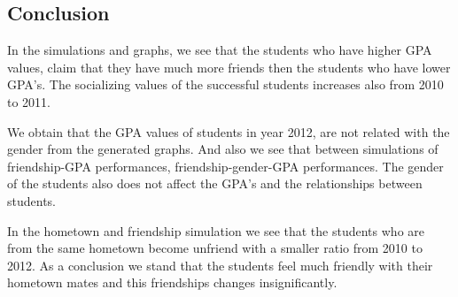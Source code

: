\documentclass[paper=a4, fontsize=11pt]{scrartcl}	%
\numberwithin{equation}{section}		%
\numberwithin{figure}{section}			%
\numberwithin{table}{section}				%
\begin{document}
\subsection{Conclusion}
In the simulations and graphs, we see that the students who have higher GPA values, claim that they have much more friends then the students who have lower GPA's. The socializing values of the successful students increases also from 2010 to 2011. 

We obtain that the GPA values of students in year 2012, are not related with the gender from the generated graphs. And also we see that between simulations of friendship-GPA performances, friendship-gender-GPA performances. The gender of the students also does not affect the GPA's and the relationships between students.

In the hometown and friendship simulation we see that the students who are from the same hometown become unfriend with a smaller ratio from 2010 to 2012. As a conclusion we stand that the students feel much friendly with their hometown mates and this friendships changes insignificantly. 

\end{document}
